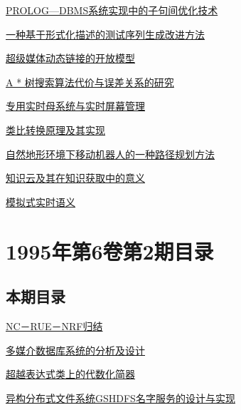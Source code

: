 \documentclass[a4paper]{article}
\begin{document}
\href{http://www.jos.org.cn/ch/reader/download_pdf.aspx?file_no=19950302&year_id=1995&quarter_id=3&falg=1}{PROLOG—DBMS系统实现中的子句间优化技术}

\href{http://www.jos.org.cn/ch/reader/download_pdf.aspx?file_no=19950303&year_id=1995&quarter_id=3&falg=1}{一种基于形式化描述的测试序列生成改进方法}

\href{http://www.jos.org.cn/ch/reader/download_pdf.aspx?file_no=19950304&year_id=1995&quarter_id=3&falg=1}{超级媒体动态链接的开放模型}

\href{http://www.jos.org.cn/ch/reader/download_pdf.aspx?file_no=19950305&year_id=1995&quarter_id=3&falg=1}{A * 树搜索算法代价与误差关系的研究}

\href{http://www.jos.org.cn/ch/reader/download_pdf.aspx?file_no=19950306&year_id=1995&quarter_id=3&falg=1}{专用实时母系统与实时屏幕管理}

\href{http://www.jos.org.cn/ch/reader/download_pdf.aspx?file_no=19950307&year_id=1995&quarter_id=3&falg=1}{类比转换原理及其实现}

\href{http://www.jos.org.cn/ch/reader/download_pdf.aspx?file_no=19950308&year_id=1995&quarter_id=3&falg=1}{自然地形环境下移动机器人的一种路径规划方法}

\href{http://www.jos.org.cn/ch/reader/download_pdf.aspx?file_no=19950309&year_id=1995&quarter_id=3&falg=1}{知识云及其在知识获取中的意义}

\href{http://www.jos.org.cn/ch/reader/download_pdf.aspx?file_no=19950310&year_id=1995&quarter_id=3&falg=1}{模拟式实时语义}


\section{\textbf{1995年第6卷第2期目录}}
\subsection{本期目录}
\href{http://www.jos.org.cn/ch/reader/download_pdf.aspx?file_no=19950201&year_id=1995&quarter_id=2&falg=1}{NC－RUE－NRF归结}

\href{http://www.jos.org.cn/ch/reader/download_pdf.aspx?file_no=19950202&year_id=1995&quarter_id=2&falg=1}{多媒介数据库系统的分析及设计}

\href{http://www.jos.org.cn/ch/reader/download_pdf.aspx?file_no=19950203&year_id=1995&quarter_id=2&falg=1}{超越表达式类上的代数化简器}

\href{http://www.jos.org.cn/ch/reader/download_pdf.aspx?file_no=19950204&year_id=1995&quarter_id=2&falg=1}{异构分布式文件系统GSHDFS名字服务的设计与实现}
\end{document}
